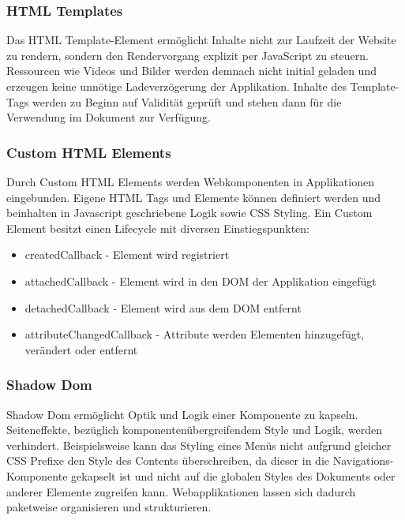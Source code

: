 \vspace{0.3cm}

\vspace{0.3cm}

\subsubsection{HTML Templates}

Das HTML Template-Element ermöglicht Inhalte nicht zur Laufzeit der Website zu rendern,
sondern den Rendervorgang explizit per JavaScript zu steuern. Ressourcen wie Videos und Bilder werden demnach
nicht initial geladen und erzeugen keine unnötige Ladeverzögerung der Applikation.
Inhalte des Template-Tags werden zu Beginn auf Validität geprüft und stehen dann für die Verwendung im Dokument
zur Verfügung.

\subsubsection{Custom HTML Elements}

Durch Custom HTML Elements werden Webkomponenten in Applikationen eingebunden.
Eigene HTML Tags und Elemente können definiert werden und beinhalten in Javascript geschriebene Logik sowie CSS Styling.
Ein Custom Element besitzt einen Lifecycle mit diversen Einstiegspunkten:

\begin{itemize}
\item createdCallback - Element wird registriert
\item attachedCallback - Element wird in den DOM der Applikation eingefügt
\item detachedCallback - Element wird aus dem DOM entfernt
\item attributeChangedCallback - Attribute werden Elementen hinzugefügt, verändert oder entfernt
\end{itemize}


\subsubsection{Shadow Dom}
Shadow Dom ermöglicht Optik und Logik einer Komponente zu kapseln.
Seiteneffekte, bezüglich komponentenübergreifendem Style und Logik, werden verhindert.
Beispielsweise kann das Styling eines Menüs nicht aufgrund gleicher CSS Prefixe den Style des Contents überschreiben,
da dieser in die Navigations-Komponente gekapselt ist und nicht auf die globalen Styles des Dokuments oder anderer Elemente zugreifen kann.
Webapplikationen lassen sich dadurch paketweise organisieren und strukturieren.
